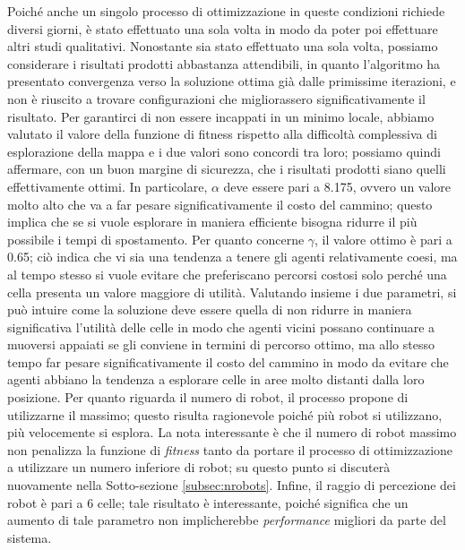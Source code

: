Poiché anche un singolo processo di ottimizzazione in queste condizioni richiede diversi giorni, è stato effettuato una sola volta in modo da poter poi effettuare altri studi qualitativi. 
Nonostante sia stato effettuato una sola volta, possiamo considerare i risultati prodotti abbastanza attendibili, in quanto l'algoritmo ha presentato convergenza verso la soluzione ottima già dalle primissime iterazioni, e non è riuscito a trovare configurazioni che migliorassero significativamente il risultato.
Per garantirci di non essere incappati in un minimo locale, abbiamo valutato il valore della funzione di fitness rispetto alla difficoltà complessiva di esplorazione della mappa e i due valori sono concordi tra loro; possiamo quindi affermare, con un buon margine di sicurezza, che i risultati prodotti siano quelli effettivamente ottimi.
In particolare, $\alpha$ deve essere pari a 8.175, ovvero un valore molto alto che va a far pesare significativamente il costo del cammino; questo implica che se si vuole esplorare in maniera efficiente bisogna ridurre il più possibile i tempi di spostamento.
Per quanto concerne $\gamma$, il valore ottimo è pari a 0.65; ciò indica che vi sia una tendenza a tenere gli agenti relativamente coesi, ma al tempo stesso si vuole evitare che preferiscano percorsi costosi solo perché una cella presenta un valore maggiore di utilità.
Valutando insieme i due parametri, si può intuire come la soluzione deve essere quella di non ridurre in maniera significativa l'utilità delle celle in modo che agenti vicini possano continuare a muoversi appaiati se gli conviene in termini di percorso ottimo, ma allo stesso tempo far pesare significativamente il costo del cammino in modo da evitare che agenti abbiano la tendenza a esplorare celle in aree molto distanti dalla loro posizione.
Per quanto riguarda il numero di robot, il processo propone di utilizzarne il massimo; questo risulta ragionevole poiché più robot si utilizzano, più velocemente si esplora. La nota interessante è che il numero di robot massimo non penalizza la funzione di \textit{fitness} tanto da portare il processo di ottimizzazione a utilizzare un numero inferiore di robot; su questo punto si discuterà nuovamente nella Sotto-sezione \ref{subsec:nrobots}.
Infine, il raggio di percezione dei robot è pari a 6 celle; tale risultato è interessante, poiché significa che un aumento di tale parametro non implicherebbe \textit{performance} migliori da parte del sistema.

